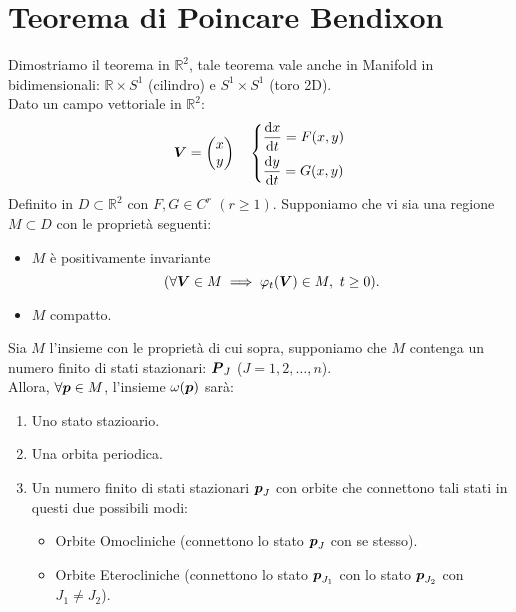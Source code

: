 \section{Teorema di Poincare Bendixon}%
\label{sub:Teorema di Poincare Bendixon}
Dimostriamo il teorema in $\mathbb{R}^2$, tale teorema vale anche in Manifold in bidimensionali: $\mathbb{R} \times S^1$ (cilindro) e $S^1\times S^1$ (toro 2D).\\
Dato un campo vettoriale in $\mathbb{R}^2$:
\[
    \boldsymbol{V}=\begin{pmatrix} x \\ y \end{pmatrix} \quad  
    \begin{dcases}
	\frac{\text{d} x}{\text{d} t} = F(x, y) \\
	\frac{\text{d} y}{\text{d} t} = G(x, y) 
    \end{dcases}
\]
Definito in $D \subset \mathbb{R}^2$ con $F, G \in C^r$ $(r\ge 1)$. Supponiamo che vi sia una regione $M \subset D$ con le proprietà seguenti:
\begin{itemize}
    \item $M$ è positivamente invariante
	\[
	(\forall \boldsymbol{V}\in M \implies  \varphi_t(\boldsymbol{V}) \in M, \ t\ge 0)
	.\] 
    \item $M$ compatto.
\end{itemize}
\begin{thm}
    Sia $M$ l'insieme con le proprietà di cui sopra, supponiamo che $M$ contenga un numero finito di stati stazionari: $\boldsymbol{P}_J$ ($J=1, 2,\ldots, n$).\\
    Allora, $\forall \boldsymbol{p}\in M$, l'insieme $\omega (\boldsymbol{p})$ sarà:
    \begin{enumerate}
        \item Uno stato stazioario.
	\item Una orbita periodica.
	\item Un numero finito di stati stazionari $\boldsymbol{p}_J$ con orbite che connettono tali stati in questi due possibili modi:
	    \begin{itemize}
		\item Orbite Omocliniche (connettono lo stato $\boldsymbol{p}_J$ con se stesso).
		\item Orbite Eterocliniche (connettono lo stato $\boldsymbol{p}_{J_1}$ con lo stato $\boldsymbol{p}_{J_2}$ con $J_1 \neq J_2$).
	    \end{itemize}
    \end{enumerate}
\end{thm}
\noindent
